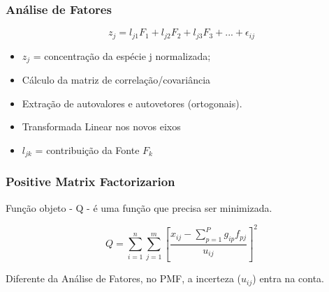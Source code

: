 \begin{frame}
  \frametitle{Análise de Fatores}
  \begin{equation*}
    z_{j} = l_{j1}F_1 + l_{j2}F_2 + l_{j3}F_3 + ... + \epsilon_{ij}
  \end{equation*}
  \begin{itemize}
    \item $z_{j}$ = concentração da espécie j normalizada;
    \item Cálculo da matriz de correlação/covariância
    \item Extração de autovalores e autovetores (ortogonais). 
    \item Transformada Linear nos novos eixos
    \item $l_{jk}$ = contribuição da Fonte $F_k$
  \end{itemize}

\end{frame}


\begin{frame}
  \frametitle{Positive Matrix Factorizarion}

  Função objeto - Q -  é uma função que precisa ser minimizada. 
 
  \begin{equation*}
    Q = \sum_{i=1}^n \sum_{j=1}^m  \left[ \frac{ x_{ij} - \sum_{p=1}^{P} g_{ip}f_{pj}} {u_{ij}} \right] ^2
  \end{equation*}

  Diferente da Análise de Fatores, no PMF, a incerteza ($u_{ij}$) entra na conta.
\end{frame}

